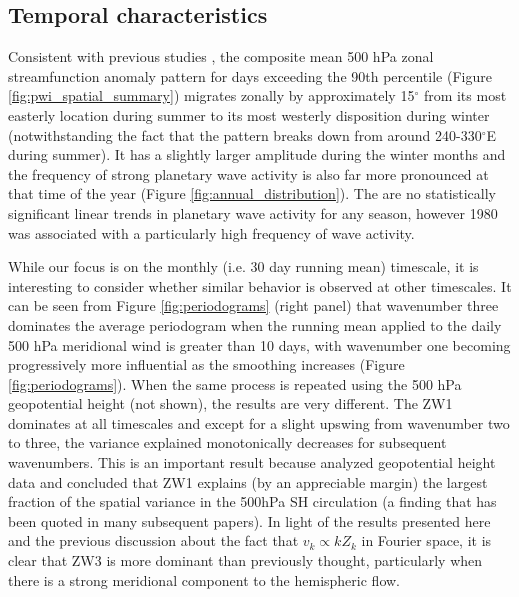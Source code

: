 \subsection{Temporal characteristics}

Consistent with previous studies \citep{vanLoon1984,Mo1985}, the composite mean 500 hPa zonal streamfunction anomaly pattern for days exceeding the 90th percentile (Figure \ref{fig:pwi_spatial_summary}) migrates zonally by approximately 15$^{\circ}$ from its most easterly location during summer to its most westerly disposition during winter (notwithstanding the fact that the pattern breaks down from around 240-330$^{\circ}$E during summer). It has a slightly larger amplitude during the winter months and the frequency of strong planetary wave activity is also far more pronounced at that time of the year (Figure \ref{fig:annual_distribution}). The are no statistically significant linear trends in planetary wave activity for any season, however 1980 was associated with a particularly high frequency of wave activity.

While our focus is on the monthly (i.e. 30 day running mean) timescale, it is interesting to consider whether similar behavior is observed at other timescales. It can be seen from Figure \ref{fig:periodograms} (right panel) that wavenumber three dominates the average periodogram when the running mean applied to the daily 500 hPa meridional wind is greater than 10 days, with wavenumber one becoming progressively more influential as the smoothing increases (Figure \ref{fig:periodograms}). When the same process is repeated using the 500 hPa geopotential height (not shown), the results are very different. The ZW1 dominates at all timescales and except for a slight upswing from wavenumber two to three, the variance explained monotonically decreases for subsequent wavenumbers. This is an important result because \citet{vanLoon1972} analyzed geopotential height data and concluded that ZW1 explains (by an appreciable margin) the largest fraction of the spatial variance in the 500hPa SH circulation (a finding that has been quoted in many subsequent papers). In light of the results presented here and the previous discussion about the fact that $v_k \propto k Z_k$ in Fourier space, it is clear that ZW3 is more dominant than previously thought, particularly when there is a strong meridional component to the hemispheric flow. 


